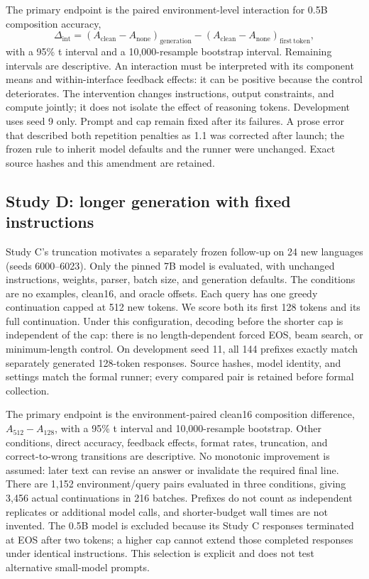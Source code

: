 \documentclass[11pt]{article}
\begin{document}
The primary endpoint is the paired environment-level interaction for 0.5B
composition accuracy,
\[
 \Delta_{\mathrm{int}}=
 (A_{\mathrm{clean}}-A_{\mathrm{none}})_{\mathrm{generation}}
 -(A_{\mathrm{clean}}-A_{\mathrm{none}})_{\mathrm{first\ token}},
\]
with a 95\% t interval and a 10,000-resample bootstrap interval. Remaining
intervals are descriptive. An interaction must be interpreted with its component
means and within-interface feedback effects: it can be positive because the
control deteriorates. The intervention changes instructions, output constraints,
and compute jointly; it does not isolate the effect of reasoning tokens.
Development uses seed 9 only. Prompt and cap remain fixed after its failures.
A prose error that described both repetition penalties as 1.1 was corrected
after launch; the frozen rule to inherit model defaults and the runner were
unchanged. Exact source hashes and this amendment are retained.

\subsection{Study D: longer generation with fixed instructions}
Study C's truncation motivates a separately frozen follow-up on 24 new
languages (seeds 6000--6023). Only the pinned 7B model is evaluated, with
unchanged instructions, weights, parser, batch size, and generation defaults.
The conditions are no examples, clean16, and oracle offsets. Each query has
one greedy continuation capped at 512 new tokens. We score both its first
128 tokens and its full continuation. Under this configuration, decoding before
the shorter cap is independent of the cap: there is no length-dependent forced
EOS, beam search, or minimum-length control. On development seed 11, all 144
prefixes exactly match separately generated 128-token responses. Source hashes,
model identity, and settings match the formal runner; every compared pair is
retained before formal collection.

The primary endpoint is the environment-paired clean16 composition difference,
$A_{512}-A_{128}$, with a 95\% t interval and 10,000-resample bootstrap.
Other conditions, direct accuracy, feedback effects, format rates, truncation,
and correct-to-wrong transitions are descriptive. No monotonic improvement is
assumed: later text can revise an answer or invalidate the required final line.
There are 1,152 environment/query pairs evaluated in three conditions, giving
3,456 actual continuations in 216 batches. Prefixes do not count as independent
replicates or additional model calls, and shorter-budget wall times are not
invented. The 0.5B model is excluded because its Study C responses terminated
at EOS after two tokens; a higher cap cannot extend those completed responses
under identical instructions. This selection is explicit and does not test
alternative small-model prompts.
\end{document}
